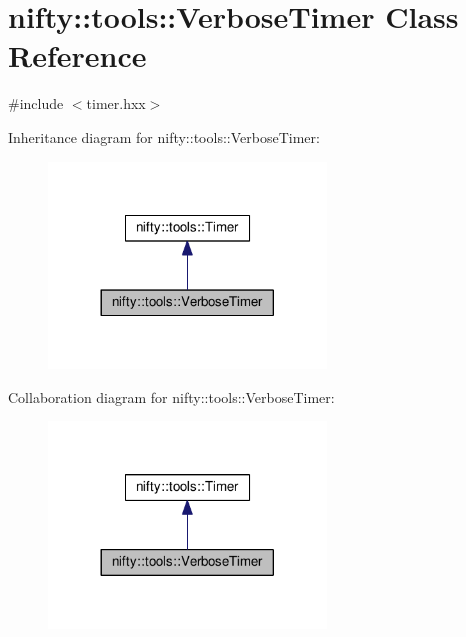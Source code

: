 \hypertarget{classnifty_1_1tools_1_1VerboseTimer}{}\section{nifty\+:\+:tools\+:\+:Verbose\+Timer Class Reference}
\label{classnifty_1_1tools_1_1VerboseTimer}


{\ttfamily \#include $<$timer.\+hxx$>$}



Inheritance diagram for nifty\+:\+:tools\+:\+:Verbose\+Timer\+:\nopagebreak
\begin{figure}[H]
\begin{center}
\leavevmode
\includegraphics[width=209pt]{classnifty_1_1tools_1_1VerboseTimer__inherit__graph}
\end{center}
\end{figure}


Collaboration diagram for nifty\+:\+:tools\+:\+:Verbose\+Timer\+:\nopagebreak
\begin{figure}[H]
\begin{center}
\leavevmode
\includegraphics[width=209pt]{classnifty_1_1tools_1_1VerboseTimer__coll__graph}
\end{center}
\end{figure}
